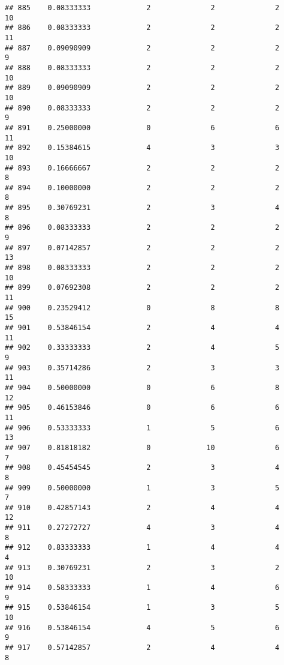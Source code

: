 \documentclass[
]{article}
\begin{document}
\begin{verbatim}
## 885    0.08333333             2              2              2             10
## 886    0.08333333             2              2              2             11
## 887    0.09090909             2              2              2              9
## 888    0.08333333             2              2              2             10
## 889    0.09090909             2              2              2             10
## 890    0.08333333             2              2              2              9
## 891    0.25000000             0              6              6             11
## 892    0.15384615             4              3              3             10
## 893    0.16666667             2              2              2              8
## 894    0.10000000             2              2              2              8
## 895    0.30769231             2              3              4              8
## 896    0.08333333             2              2              2              9
## 897    0.07142857             2              2              2             13
## 898    0.08333333             2              2              2             10
## 899    0.07692308             2              2              2             11
## 900    0.23529412             0              8              8             15
## 901    0.53846154             2              4              4             11
## 902    0.33333333             2              4              5              9
## 903    0.35714286             2              3              3             11
## 904    0.50000000             0              6              8             12
## 905    0.46153846             0              6              6             11
## 906    0.53333333             1              5              6             13
## 907    0.81818182             0             10              6              7
## 908    0.45454545             2              3              4              8
## 909    0.50000000             1              3              5              7
## 910    0.42857143             2              4              4             12
## 911    0.27272727             4              3              4              8
## 912    0.83333333             1              4              4              4
## 913    0.30769231             2              3              2             10
## 914    0.58333333             1              4              6              9
## 915    0.53846154             1              3              5             10
## 916    0.53846154             4              5              6              9
## 917    0.57142857             2              4              4              8

\end{verbatim}
\end{document}
